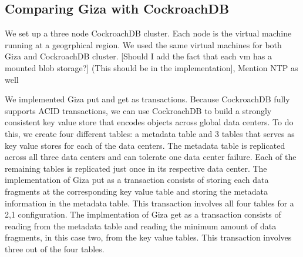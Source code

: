 \subsection{Comparing Giza with CockroachDB}
We set up a three node CockroachDB cluster. Each node is the virtual machine running at a geogrphical region. We used the same virtual machines for both Giza and CockroachDB cluster. [Should I add the fact that each vm has a mounted blob storage?] (This should be in the implementation], Mention NTP as well

We implemented Giza put and get as transactions. Because CockroachDB fully supports ACID transactions, we can use CockroachDB to build a strongly consistent key value store that encodes objects across global data centers. To do this, we create four different tables: a metadata table and 3 tables that serves as key value stores for each of the data centers. The metadata table is replicated across all three data centers and can tolerate one data center failure. Each of the remaining tables is replicated just once in its respective data center. The implementation of Giza put as a transaction consists of storing each data fragments at the corresponding key value table and storing the metadata information in the metadata table. This transaction involves all four tables for a 2,1 configuration. The implmentation of Giza get as a transaction consists of reading from the metadata table and reading the minimum amount of data fragments, in this case two, from the key value tables. This transaction involves three out of the four tables.


